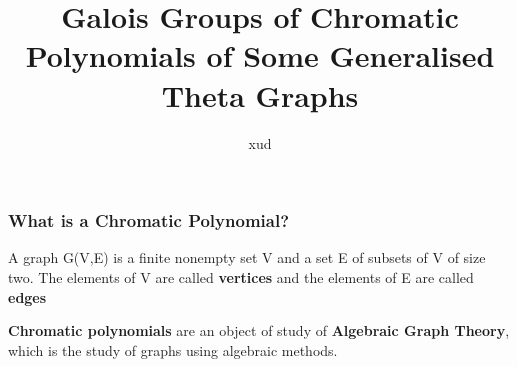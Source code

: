 \documentclass{beamer}
\begin{document}
\title[Galois Groups of Chromatic Polynomials of Some Generalised Theta Graphs]{Galois Groups of Chromatic Polynomials of Some Generalised Theta Graphs}
\author[xud]{xud}

\date{}
\begin{frame}
\titlepage
\end{frame}


\begin{frame}
\frametitle{What is a Chromatic Polynomial?}
\begin{definition}[Graph]
A graph G(V,E) is a finite nonempty set V and a set E of
subsets of V of size two. The elements of V are called \textbf{vertices} and the elements of E are called \textbf{edges}
\end{definition}
\begin{center}

\end{center}

\textbf{Chromatic polynomials} are an object of study of \textbf{Algebraic Graph Theory}, which is the study of graphs using algebraic methods.
\end{frame}
\end{document}
